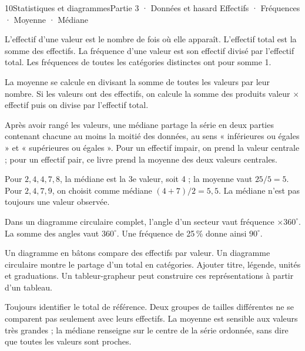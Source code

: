 \begin{ouverture}[statistiques]{10}{Statistiques et diagrammes}{Partie 3 · Données et hasard}
{Effectifs · Fréquences · Moyenne · Médiane}
\end{ouverture}
\pagestyle{otMain}\essentiel\fontsize{11}{15}\selectfont
{}\label{cours-10-1}
\begin{definition}L’effectif d’une valeur est le nombre de fois où elle apparaît. L’effectif total est la somme des effectifs. La fréquence d’une valeur est son effectif divisé par l’effectif total. Les fréquences de toutes les catégories distinctes ont pour somme 1.\end{definition}
\begin{propriete}La moyenne se calcule en divisant la somme de toutes les valeurs par leur nombre. Si les valeurs ont des effectifs, on calcule la somme des produits valeur $\times$ effectif puis on divise par l’effectif total.\end{propriete}
\begin{definition}Après avoir rangé les valeurs, une médiane partage la série en deux parties contenant chacune au moins la moitié des données, au sens « inférieures ou égales » et « supérieures ou égales ». Pour un effectif impair, on prend la valeur centrale ; pour un effectif pair, ce livre prend la moyenne des deux valeurs centrales.\end{definition}
\begin{exemple}Pour $2,4,4,7,8$, la médiane est la 3e valeur, soit 4 ; la moyenne vaut $25/5=5$. Pour $2,4,7,9$, on choisit comme médiane $(4+7)/2=5{,}5$. La médiane n’est pas toujours une valeur observée.\end{exemple}
\clearpage
{}\label{cours-10-2}
\begin{propriete}Dans un diagramme circulaire complet, l’angle d’un secteur vaut fréquence $\times360^\circ$. La somme des angles vaut $360^\circ$. Une fréquence de 25\,\% donne ainsi $90^\circ$.\end{propriete}
\label{fig-cours-10-2-cours-camembert}

\begin{savoirfaire}Un diagramme en bâtons compare des effectifs par valeur. Un diagramme circulaire montre le partage d’un total en catégories. Ajouter titre, légende, unités et graduations. Un tableur-grapheur peut construire ces représentations à partir d’un tableau.\end{savoirfaire}
\begin{attention}Toujours identifier le total de référence. Deux groupes de tailles différentes ne se comparent pas seulement avec leurs effectifs. La moyenne est sensible aux valeurs très grandes ; la médiane renseigne sur le centre de la série ordonnée, sans dire que toutes les valeurs sont proches.\end{attention}

